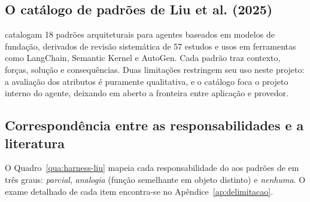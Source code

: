\subsection{O catálogo de padrões de Liu et al. (2025)}
\label{subsec:harness-catalogo}

 catalogam 18 padrões arquiteturais para agentes baseados em
modelos de fundação, derivados de revisão sistemática de 57 estudos e usos em
ferramentas como LangChain, Semantic Kernel e AutoGen. Cada padrão traz contexto,
forças, solução e consequências. Duas limitações restringem seu uso neste
projeto: a avaliação dos atributos é puramente qualitativa, e o catálogo foca o
projeto interno do agente, deixando em aberto a fronteira entre aplicação e
provedor.

\subsection{Correspondência entre as responsabilidades e a literatura}
\label{subsec:harness-correspondencia}

O Quadro~\ref{qua:harness-liu} mapeia cada responsabilidade do \harness{} aos
padrões de  em três graus: \textit{parcial}, \textit{analogia}
(função semelhante em objeto distinto) e \textit{nenhuma}. O exame detalhado
de cada item encontra-se no Apêndice~\ref{ap:delimitacao}.


